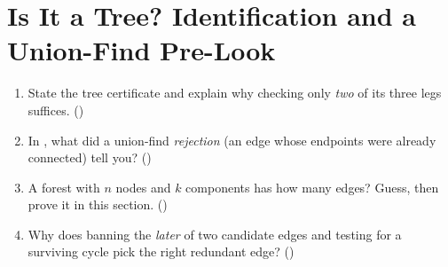 \section{Is It a Tree? Identification and a Union-Find Pre-Look}\label{sec:c25-identify}

\begin{previouslybox}
\begin{enumerate}[nosep, leftmargin=1.6em]
  \item State the tree certificate and explain why checking only \emph{two} of its three legs
        suffices. ()
  \item In , what did a union-find \emph{rejection} (an edge whose endpoints were
        already connected) tell you? ()
  \item A forest with $n$ nodes and $k$ components has how many edges? Guess, then prove it in
        this section. ()
  \item Why does banning the \emph{later} of two candidate edges and testing for a surviving cycle
        pick the right redundant edge? ()
\end{enumerate}
\end{previouslybox}

